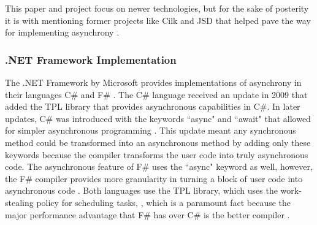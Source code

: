 This paper and project focus on newer technologies, but for the sake of posterity it is with mentioning former projects like Cilk and JSD that helped pave the way for implementing asynchrony \cite{sutcliffe1988jackson}\cite{Cameron1986}\cite{Frigo1998}.

\subsubsection{.NET Framework Implementation}

The .NET Framework by Microsoft provides implementations of asynchrony in their languages C\# and F\# \cite{syme2011f}\cite{Leijen2009}. The C\# language received an update in 2009 that added the TPL library that provides asynchronous capabilities in C\#. In later updates, C\# was introduced with the keywords ``async" and ``await" that allowed for simpler asynchronous programming \cite{alexdavies2012}. This update meant any synchronous method could be transformed into an asynchronous method by adding only these keywords because the compiler transforms the user code into truly asynchronous code. The asynchronous feature of F\# uses the ``async" keyword as well, however, the F\# compiler provides more granularity in turning a block of user code into asynchronous code \cite{syme2011f}. Both languages use the TPL library, which uses the work-stealing policy for scheduling tasks, \cite{Leijen2009}\cite{msftVFS}, which is a paramount fact because the major performance advantage that F\# has over C\# is the better compiler \cite{syme2011f}.
